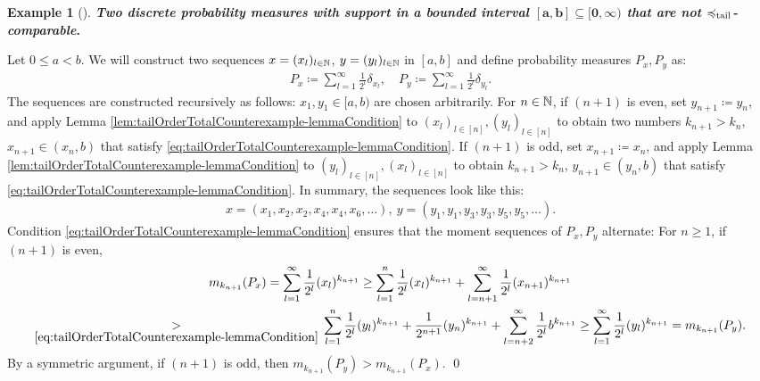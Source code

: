 \documentclass[a4paper,DIV=11]{scrreprt}
\theoremstyle{definition}
\newtheorem{ex}[thm]{Example} %
\begin{document}
    \begin{ex}[{\cite{bib:epperleinTailOrderTotalCounterexample}}]
        \textbf{\textsl{Two discrete probability measures with support in a bounded interval $\mathbf{\boldsymbol{[a, b] \subseteq [0, \infty)}}$ that are not $\preccurlyeq_{\text{tail}}$-comparable}.}
        
        Let $0 \leq a < b$.
        We will construct two sequences $x = (x_l)_{l \in \mathbb{N}}$, $y = (y_l)_{l \in \mathbb{N}}$ in $[a, b]$ and define probability measures $P_x, P_y$ as:
        \begin{gather*}
            P_x \coloneqq \sum_{l=1}^{\infty} \frac{1}{2^l} \delta_{x_l}, \quad
            P_y \coloneqq \sum_{l=1}^{\infty} \frac{1}{2^l} \delta_{y_l}.
        \end{gather*}
        The sequences are constructed recursively as follows: $x_1, y_1 \in [a, b)$ are chosen arbitrarily.
        For $n \in \mathbb{N}$, if $(n+1)$ is even, set $y_{n+1} \coloneqq y_n$, and apply Lemma \ref{lem:tailOrderTotalCounterexample-lemmaCondition} to $(x_l)_{l \in [n]}, (y_l)_{l \in [n]}$ to obtain two numbers $k_{n+1} > k_n$, $x_{n+1} \in (x_n, b)$ that satisfy \eqref{eq:tailOrderTotalCounterexample-lemmaCondition}.
        If $(n+1)$ is odd, set $x_{n+1} \coloneqq x_n$, and apply Lemma \ref{lem:tailOrderTotalCounterexample-lemmaCondition} to $(y_l)_{l \in [n]}, (x_l)_{l \in [n]}$ to obtain $k_{n+1} > k_n$, ${y_{n+1} \in (y_n, b)}$ that satisfy \eqref{eq:tailOrderTotalCounterexample-lemmaCondition}.
        In summary, the sequences look like this:
        \begin{gather*}
            x = (x_1, x_2, x_2, x_4, x_4, x_6, \dots),~ y = (y_1, y_1, y_3, y_3, y_5, y_5, \dots).
        \end{gather*}
        Condition \eqref{eq:tailOrderTotalCounterexample-lemmaCondition} ensures that the moment sequences of $P_x, P_y$ alternate: For $n \geq 1$, if $(n + 1)$ is even,
        \begin{multline*}
            m_{k_{n+1}}(P_x) 
            = \sum_{l=1}^{\infty} \frac{1}{2^l} (x_l)^{k_{n+1}}
            \geq  \sum_{l=1}^{n} \frac{1}{2^l} (x_l)^{k_{n+1}} + \sum_{l = n+1}^{\infty} \frac{1}{2^l} (x_{n+1})^{k_{n+1}} \\
            \underset{\eqref{eq:tailOrderTotalCounterexample-lemmaCondition}}
            {>}\, \sum_{l=1}^{n} \frac{1}{2^l} (y_l)^{k_{n+1}} + \frac{1}{2^{n+1}} (y_n)^{k_{n+1}} + \sum_{l = n+2}^{\infty} \frac{1}{2^l} b^{k_{n+1}}
            \geq \sum_{l=1}^{\infty} \frac{1}{2^l} (y_l)^{k_{n+1}}
            = m_{k_{n+1}}(P_y).
        \end{multline*}
        By a symmetric argument, if $(n+1)$ is odd, then $m_{k_{n+1}}(P_y) > m_{k_{n+1}}(P_x)$.
        \qed
    \end{ex}
    
\end{document}
